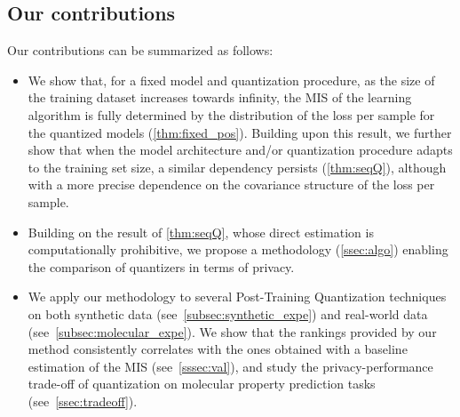 \subsection{Our contributions}
Our contributions can be summarized as follows: 
\begin{itemize}
    \item We show that, for a fixed model and quantization procedure, as the size of the training dataset increases towards infinity, the MIS of the learning algorithm is fully determined by the distribution of the loss per sample for the quantized models (\autoref{thm:fixed_pos}). Building upon this result, we further show that when the model architecture and/or quantization procedure adapts to the training set size, a similar dependency persists (\autoref{thm:seqQ}), although with a more precise dependence on the covariance structure of the loss per sample.
    
    \item Building on the result of \autoref{thm:seqQ}, whose direct estimation is computationally prohibitive, we propose a methodology (\autoref{ssec:algo}) enabling the comparison of quantizers in terms of privacy.
    \item We apply our methodology to several Post-Training Quantization techniques on both synthetic data (see~\autoref{subsec:synthetic_expe}) and real-world data (see~\autoref{subsec:molecular_expe}).
    We show that the rankings provided by our method consistently correlates with the ones obtained with a baseline estimation of the MIS (see~\autoref{sssec:val}), and study the privacy-performance trade-off of quantization on molecular property prediction tasks (see~\autoref{ssec:tradeoff}).
\end{itemize}



